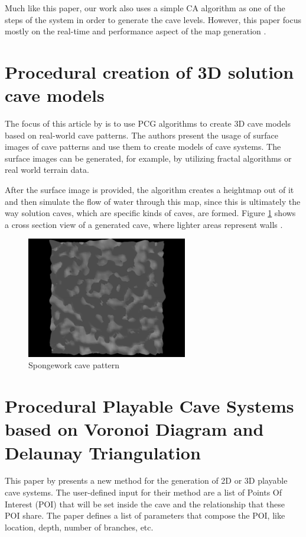 Much like this paper, our work also uses a simple CA algorithm as one of the steps of the system in order to generate the cave levels. However, this paper focus mostly on the real-time and performance aspect of the map generation \cite{johnson:2010}.

\section{Procedural creation of 3D solution cave models}

The focus of this article by \textcite{boggus:2009} is to use PCG algorithms to create 3D cave models based on real-world cave patterns. The authors present the usage of surface images of cave patterns and use them to create models of cave systems. The surface images can be generated, for example, by utilizing fractal algorithms or real world terrain data.

After the surface image is provided, the algorithm creates a heightmap out of it and then simulate the flow of water through this map, since this is ultimately the way solution caves, which are specific kinds of caves, are formed. Figure \ref{fig:3d_cave} shows a cross section view of a generated cave, where lighter areas represent walls \citeyear{boggus:2009}.
\begin{figure}[h]
    \caption{Spongework cave pattern}
    \centerline{\includegraphics[width=7cm]{images/related_work/3d_cave.png}}
    \label{fig:3d_cave}
\end{figure}

\section{Procedural Playable Cave Systems
based on Voronoi Diagram and Delaunay Triangulation}

This paper by \textcite{santamaria:2014} presents a new method for the generation of 2D or 3D playable cave systems. The user-defined input for their method are a list of Points Of Interest (POI) that will be set inside the cave and the relationship that these POI share. The paper defines a list of parameters that compose the POI, like location, depth, number of branches, etc.


